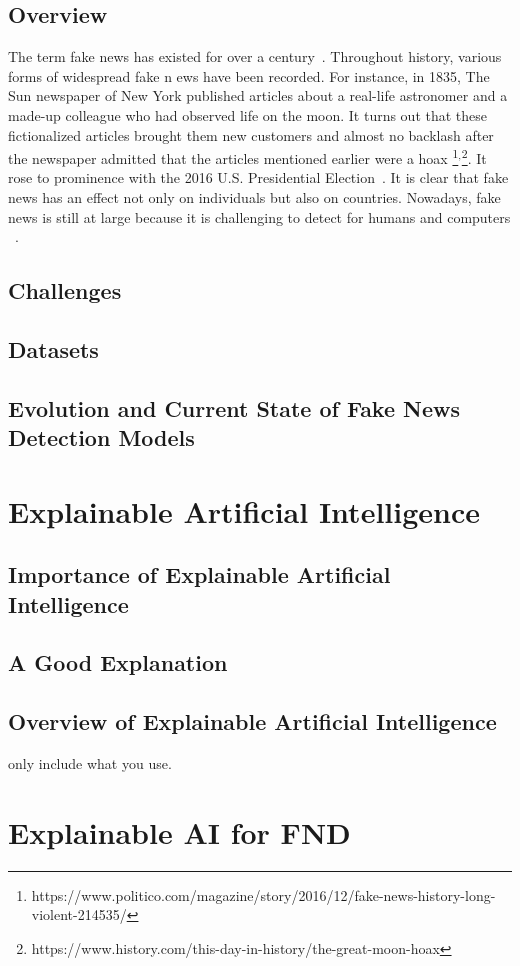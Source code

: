 \subsection{Overview}
\label{subsec:fakeNewsDetection_Overview}
The term fake news has existed for over a century~\parencite{TheScienceOfFakeNews_Lazer}. Throughout history, various forms of widespread fake n
ews have been recorded. For instance, in 1835, The Sun newspaper of New York published articles about a real-life astronomer and a made-up
colleague who had observed life on the moon. It turns out that these fictionalized articles brought them new customers and almost no backlash
after the newspaper admitted that the articles mentioned earlier were a hoax \footnote{https://www.politico.com/magazine/story/2016/12/fake-news-history-long-violent-214535/}$^,$\footnote{https://www.history.com/this-day-in-history/the-great-moon-hoax}. It rose to prominence
with the 2016 U.S. Presidential Election~\parencite{USPresidentialElection2016}. It is clear that fake news has an effect not only on individuals
but also on countries. Nowadays, fake news is still at large because it is challenging to detect for humans and computers ~\parencite{ReutersInstituteDigitalNewsReport}. \\

\subsection{Challenges}
\label{subsec:fakeNewsDetection_Challenges}

\subsection{Datasets}
\label{subsec:fakeNewsDetection_Datasets}

\subsection{Evolution and Current State of Fake News Detection Models}
\label{subsec:fakeNewsDetection_Evolution}

\section{Explainable Artificial Intelligence}
\label{sec:explainableArtificialIntelligence}

\subsection{Importance of Explainable Artificial Intelligence}

\subsection{A Good Explanation}

\subsection{Overview of Explainable Artificial Intelligence}
only include what you use.

\section{Explainable AI for FND}